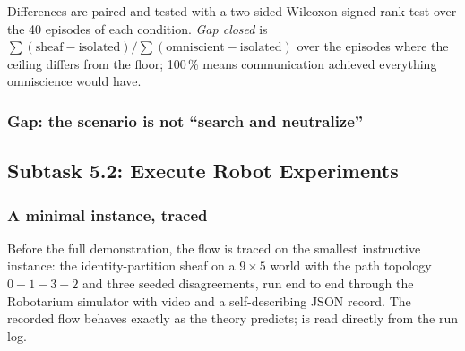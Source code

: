\documentclass[11pt]{article}
\newif\ifshowcomments
\theoremstyle{definition}
\theoremstyle{remark}
\newcommand{\prompt}[1]{%
    \ifshowcomments
        ~\todo[inline, color=techgold!80, textcolor=black,caption={Task}]{{\bf Prompt:} #1}%
    \fi
}
\newcommand{\ai}[1]{%
    \ifshowcomments
        \noindent\textcolor{techred}{[AI Agent]: #1}%
    \fi
}
\begin{document}
Differences are paired and tested with a two-sided Wilcoxon signed-rank test over the 40
episodes of each condition.
\emph{Gap closed} is $\sum(\text{sheaf} - \text{isolated}) / \sum(\text{omniscient} -
\text{isolated})$ over the episodes where the ceiling differs from the floor; 100\,\% means
communication achieved everything omniscience would have.

\subsubsection{Gap: the scenario is not ``search and neutralize''}
\label{sec:scenario-gap}

\ai{\textbf{Deviation, flagged for the sponsor.} The Program Plan gives ``searching and
neutralizing targets'' as the example UGV scenario for Subtask~5.1. The delivered scenario is
navigation to assigned targets under partial and possibly false beliefs about hazards. We
believe the substitution is sound and would defend it: it is the same
disagreement-resolution problem---agents holding contradictory claims about the world and about
each other's tasking, reconciled through the sheaf---but with a ground truth that is fully
known to the experimenter and a safety metric that is directly measurable, which a
search-and-neutralize task does not provide without a great deal of additional scaffolding
that is not itself under test. It is nonetheless a deviation from the written plan and is
recorded here rather than glossed. If the sponsor prefers the literal scenario, the belief
sheaf is unchanged and only the task layer above it would need rebuilding.}

\subsection{Subtask 5.2: Execute Robot Experiments}
\label{sec:subtask52}

\prompt{Run the experiments on UGVs, collecting data and videos showing task resolution despite
degraded conditions. Deliverable: Experimental data and videos, delivered with Milestone 4.}

\subsubsection{A minimal instance, traced}
\label{sec:traced}

Before the full demonstration, the flow is traced on the smallest instructive instance: the
identity-partition sheaf on a $9 \times 5$ world with the path topology $0-1-3-2$ and three
seeded disagreements, run end to end through the Robotarium simulator with video and a
self-describing JSON record.
The recorded flow behaves exactly as the theory predicts;  is read directly
from the run log.
\end{document}
